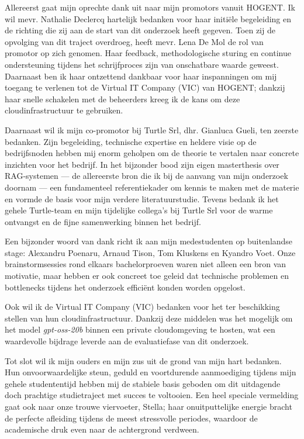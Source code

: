 Allereerst gaat mijn oprechte dank uit naar mijn promotors vanuit HOGENT. Ik wil mevr. Nathalie Declercq hartelijk bedanken voor haar initiële begeleiding en de richting die zij aan de start van dit onderzoek heeft gegeven. Toen zij de opvolging van dit traject overdroeg, heeft mevr. Lena De Mol de rol van promotor op zich genomen. Haar feedback, methodologische sturing en continue ondersteuning tijdens het schrijfproces zijn van onschatbare waarde geweest. Daarnaast ben ik haar ontzettend dankbaar voor haar inspanningen om mij toegang te verlenen tot de Virtual IT Company (VIC) van HOGENT; dankzij haar snelle schakelen met de beheerders kreeg ik de kans om deze cloudinfrastructuur te gebruiken.

Daarnaast wil ik mijn co-promotor bij Turtle Srl, dhr. Gianluca Gueli, ten zeerste bedanken. Zijn begeleiding, technische expertise en heldere visie op de bedrijfsnoden hebben mij enorm geholpen om de theorie te vertalen naar concrete inzichten voor het bedrijf. In het bijzonder bood zijn eigen masterthesis over RAG-systemen — de allereerste bron die ik bij de aanvang van mijn onderzoek doornam — een fundamenteel referentiekader om kennis te maken met de materie en vormde de basis voor mijn verdere literatuurstudie. Tevens bedank ik het gehele Turtle-team en mijn tijdelijke collega's bij Turtle Srl voor de warme ontvangst en de fijne samenwerking binnen het bedrijf.

Een bijzonder woord van dank richt ik aan mijn medestudenten op buitenlandse stage: Alexandru Poenaru, Arnaud Tison, Tom Kluskens en Kyandro Voet. Onze brainstormsessies rond elkaars bachelorproeven waren niet alleen een bron van motivatie, maar hebben er ook concreet toe geleid dat technische problemen en bottlenecks tijdens het onderzoek efficiënt konden worden opgelost.

Ook wil ik de Virtual IT Company (VIC) bedanken voor het ter beschikking stellen van hun cloudinfrastructuur. Dankzij deze middelen was het mogelijk om het model \textit{gpt-oss-20b} binnen een private cloudomgeving te hosten, wat een waardevolle bijdrage leverde aan de evaluatiefase van dit onderzoek.

Tot slot wil ik mijn ouders en mijn zus uit de grond van mijn hart bedanken. Hun onvoorwaardelijke steun, geduld en voortdurende aanmoediging tijdens mijn gehele studententijd hebben mij de stabiele basis geboden om dit uitdagende doch prachtige studietraject met succes te voltooien. Een heel speciale vermelding gaat ook naar onze trouwe viervoeter, Stella; haar onuitputtelijke energie bracht de perfecte afleiding tijdens de meest stressvolle periodes, waardoor de academische druk even naar de achtergrond verdween.